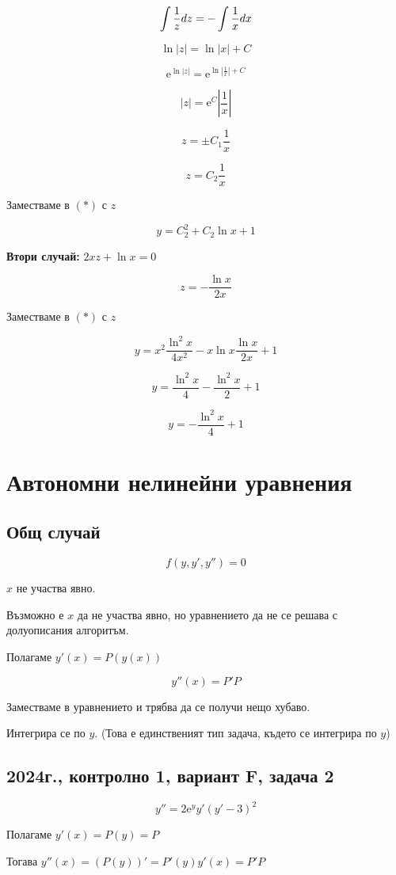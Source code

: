 \documentclass{scrartcl}
\begin{document}
$$\displaystyle \int\dfrac{1}{z}\space dz = -\int\dfrac{1}{x}\space dx$$

$$\ln{|z|}=\ln{|x|}+C$$

$$\mathrm{e}^{\ln{|z|}}=\mathrm{e}^{\ln{|\frac{1}{x}|}+C}$$

$$|z|=\mathrm{e}^C\left|\dfrac{1}{x}\right|$$

$$z=\pm C_1\dfrac{1}{x}$$

$$z=C_2\dfrac{1}{x}$$

Заместваме в $(*)$ с $z$

$$y = C_2^2+C_2\ln{x}+1$$

\textbf{Втори случай:} $2xz+\ln{x}=0$

$$z=-\dfrac{\ln{x}}{2x}$$

Заместваме в $(*)$ с $z$

$$y = x^2\dfrac{\ln^2{x}}{4x^2}-x\ln{x}\dfrac{\ln{x}}{2x}+1$$

$$y=\dfrac{\ln^2{x}}{4}-\dfrac{\ln^2{x}}{2}+1$$

$$y=-\dfrac{\ln^2{x}}{4}+1$$

\section{Автономни нелинейни уравнения}

\subsection{Общ случай}

$$f(y, y', y'') = 0$$

$x$ не участва явно.

Възможно е $x$ да не участва явно, но уравнението да не се решава с долуописания алгоритъм.

Полагаме $y'(x) = P(y(x))$

$$y''(x) = P'P$$

Заместваме в уравнението и трябва да се получи нещо хубаво.

Интегрира се по $y$. (Това е единственият тип задача, където се интегрира по $y$)

\subsection{2024г., контролно 1, вариант F, задача 2}

$$y'' = 2\mathrm{e}^y y'(y'-3)^2$$

Полагаме $y'(x) = P(y) = P$

Тогава $y''(x) = (P(y))' = P'(y)y'(x) = P'P$
\end{document}
